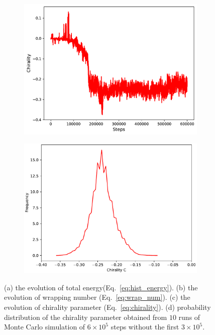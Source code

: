 \documentclass[a4paper,10pt]{article}
\begin{document}
\begin{figure}[htbp]
\begin{subfigure}{.49\textwidth}
\includegraphics[width=\textwidth]{hist_chirality.pdf}
\caption{}
\label{fig:hist_ch}
\end{subfigure}
\begin{subfigure}{.49\textwidth}
\includegraphics[width=\textwidth]{hist_ch_pr.pdf}
\caption{}
\label{fig:hist_ch_pr}
\end{subfigure}
\caption{(a) the evolution of total energy(Eq.~\ref{eq:hist_energy}).
(b) the evolution of wrapping number (Eq.~\ref{eq:wrap_num}).
(c) the evolution of chirality parameter (Eq.~\ref{eq:chirality}).
(d) probability distribution of the chirality parameter obtained from $10$ runs of Monte Carlo simulation of $6\times 10^5$ steps without the first $3\times 10^5$.}
\label{fig:hist_params}
\end{figure}
\end{document}

